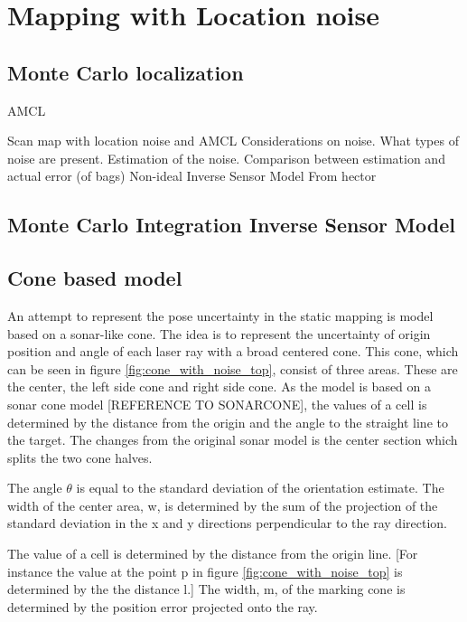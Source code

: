 \section{Mapping with Location noise}

\subsection{Monte Carlo localization}

AMCL

Scan map with location noise and AMCL
Considerations on noise. What types of noise are present. Estimation of the noise. Comparison between estimation and actual error (of bags) 
Non-ideal Inverse Sensor Model
From hector

\subsection{Monte Carlo Integration Inverse Sensor Model}

\cite{monteCarloIntegration}

\subsection{Cone based model}
An attempt to represent the pose uncertainty in the static mapping is model based on a sonar-like cone. The idea is to represent the uncertainty of origin position and angle of each laser ray with a broad centered cone. 
This cone, which can be seen in figure  \ref{fig:cone_with_noise_top}, consist of three areas. These are the center, the left side cone and right side cone. As the model is based on a sonar cone model [REFERENCE TO SONARCONE], the values of a cell is determined by the distance from the origin and the angle to the straight line to the target. The changes from the original sonar model is the center section which splits the two cone halves. 

The angle \(\theta\) is equal to the standard deviation of the orientation estimate. 
The width of the center area, w, is determined by the sum of the projection of the standard deviation in the x and y directions perpendicular to the ray direction. 

The value of a cell is determined by the distance from the origin line. [For instance the value at the point p in figure \ref{fig:cone_with_noise_top} is determined by the the distance l.] The width, m, of the marking cone is determined by the position error projected onto the ray.




